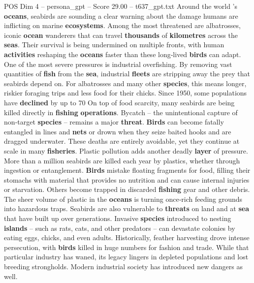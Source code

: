 \begin{textsample}{POS Dim 4 – persona\_gpt – Score 29.00 – t637\_gpt.txt}  \label{ex:f4_pos_023}
Around the world ’s \textbf{oceans}, seabirds are sounding a clear warning about the damage humans are inflicting on marine \textbf{ecosystems}.
Among the most threatened are albatrosses, iconic \textbf{ocean} wanderers that can travel \textbf{thousands} of \textbf{kilometres} across the \textbf{seas}.
Their survival is being undermined on multiple fronts, with human \textbf{activities} reshaping the \textbf{oceans} faster than these long‑lived \textbf{birds} can adapt.
One of the most severe pressures is industrial overfishing.
By removing vast quantities of \textbf{fish} from the \textbf{sea}, industrial \textbf{fleets} are stripping away the prey that seabirds depend on.
For albatrosses and many other \textbf{species}, this means longer, riskier foraging trips and less food for their chicks.
Since 1950, some populations have \textbf{declined} by up to 70 %
On top of food scarcity, many seabirds are being killed directly in \textbf{fishing} \textbf{operations}.
Bycatch – the unintentional capture of non‑target \textbf{species} – remains a major \textbf{threat}. \textbf{Birds} can become fatally entangled in lines and \textbf{nets} or drown when they seize baited hooks and are dragged underwater.
These deaths are entirely avoidable, yet they continue at scale in many \textbf{fisheries}.
Plastic pollution adds another deadly \textbf{layer} of pressure.
More than a million seabirds are killed each year by plastics, whether through ingestion or entanglement. \textbf{Birds} mistake floating fragments for food, filling their stomachs with material that provides no nutrition and can cause internal injuries or starvation.
Others become trapped in discarded \textbf{fishing} gear and other debris.
The sheer volume of plastic in the \textbf{oceans} is turning once‑rich feeding grounds into hazardous traps.
Seabirds are also vulnerable to \textbf{threats} on land and at \textbf{sea} that have built up over generations.
Invasive \textbf{species} introduced to nesting \textbf{islands} – such as rats, cats, and other predators – can devastate colonies by eating eggs, chicks, and even adults.
Historically, feather harvesting drove intense persecution, with \textbf{birds} killed in huge numbers for fashion and trade.
While that particular industry has waned, its legacy lingers in depleted populations and lost breeding strongholds.
Modern industrial society has introduced new dangers as well.

\end{textsample}
